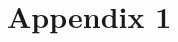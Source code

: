 \documentclass[11pt]{article}
\begin{document}
% 







\pagebreak
\section{Appendix 1}
\end{document}

